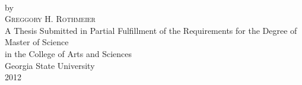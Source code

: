 \thispagestyle{empty}
\begin{titlepage}
\begin{center}
\textsc{\thesisTitle} \\
\vspace{1.0in}
by \\
\vspace{1.0in}
\textsc{Greggory H. Rothmeier} \\
\vspace{3.0in}
A Thesis Submitted in Partial Fulfillment of the Requirements for the Degree of\\
Master of Science\\
in the College of Arts and Sciences\\
Georgia State University\\
2012\\
\vspace*{\fill}
\end{center}
\end{titlepage}
